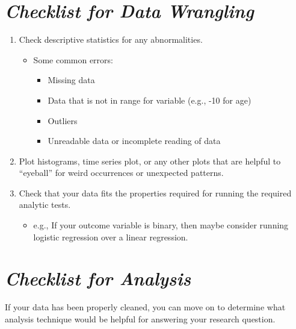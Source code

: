 \documentclass[
]{book}
\providecommand{\tightlist}{%
  \setlength{\itemsep}{0pt}\setlength{\parskip}{0pt}}
\begin{document}
\hypertarget{checklist-for-data-wrangling}{%
\section{\texorpdfstring{\emph{Checklist for Data Wrangling} }{Checklist for Data Wrangling }}\label{checklist-for-data-wrangling}}

\begin{enumerate}
\def\labelenumi{\arabic{enumi}.}
\tightlist
\item
  Check descriptive statistics for any abnormalities.

  \begin{itemize}
  \item
    Some common errors:

    \begin{itemize}
    \item
      Missing data
    \item
      Data that is not in range for variable (e.g., -10 for age)
    \item
      Outliers
    \item
      Unreadable data or incomplete reading of data
    \end{itemize}
  \end{itemize}
\item
  Plot histograms, time series plot, or any other plots that are helpful to ``eyeball'' for weird occurrences or unexpected patterns.
\item
  Check that your data fits the properties required for running the required analytic tests.

  \begin{itemize}
  \tightlist
  \item
    e.g., If your outcome variable is binary, then maybe consider running logistic regression over a linear regression.
  \end{itemize}
\end{enumerate}

\hypertarget{checklist-for-analysis}{%
\section{\texorpdfstring{\emph{Checklist for Analysis}}{Checklist for Analysis}}\label{checklist-for-analysis}}

If your data has been properly cleaned, you can move on to determine what analysis technique would be helpful for answering your research question.
\end{document}
